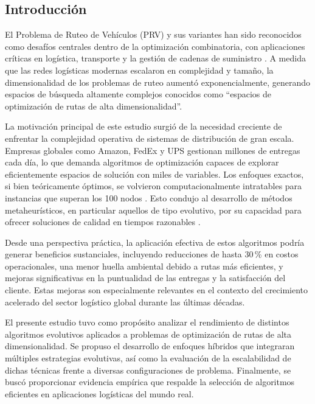 \documentclass[10pt,a4paper]{article}
\begin{document}
\vspace{1em}


\begin{multicols}{2}
\section{Introducción}

El Problema de Ruteo de Vehículos (PRV) y sus variantes han sido reconocidos como desafíos centrales dentro de la optimización combinatoria, con aplicaciones críticas en logística, transporte y la gestión de cadenas de suministro \cite{toth2014}. A medida que las redes logísticas modernas escalaron en complejidad y tamaño, la dimensionalidad de los problemas de ruteo aumentó exponencialmente, generando espacios de búsqueda altamente complejos conocidos como ``espacios de optimización de rutas de alta dimensionalidad''.

La motivación principal de este estudio surgió de la necesidad creciente de enfrentar la complejidad operativa de sistemas de distribución de gran escala. Empresas globales como Amazon, FedEx y UPS gestionan millones de entregas cada día, lo que demanda algoritmos de optimización capaces de explorar eficientemente espacios de solución con miles de variables. Los enfoques exactos, si bien teóricamente óptimos, se volvieron computacionalmente intratables para instancias que superan los 100 nodos \cite{applegate2007}. Esto condujo al desarrollo de métodos metaheurísticos, en particular aquellos de tipo evolutivo, por su capacidad para ofrecer soluciones de calidad en tiempos razonables \cite{blum2003}.

Desde una perspectiva práctica, la aplicación efectiva de estos algoritmos podría generar beneficios sustanciales, incluyendo reducciones de hasta 30\,\% en costos operacionales, una menor huella ambiental debido a rutas más eficientes, y mejoras significativas en la puntualidad de las entregas y la satisfacción del cliente. Estas mejoras son especialmente relevantes en el contexto del crecimiento acelerado del sector logístico global durante las últimas décadas.

El presente estudio tuvo como propósito analizar el rendimiento de distintos algoritmos evolutivos aplicados a problemas de optimización de rutas de alta dimensionalidad. Se propuso el desarrollo de enfoques híbridos que integraran múltiples estrategias evolutivas, así como la evaluación de la escalabilidad de dichas técnicas frente a diversas configuraciones de problema. Finalmente, se buscó proporcionar evidencia empírica que respalde la selección de algoritmos eficientes en aplicaciones logísticas del mundo real.


\end{multicols}
\end{document}
